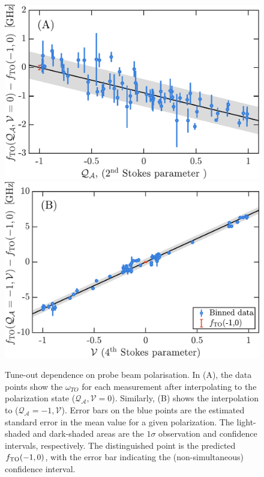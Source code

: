 	\begin{figure}
	\centering
	\includegraphics[width=\textwidth]{fig/tuneout/q_dep_1_min.pdf}
	\includegraphics[width=\textwidth]{fig/tuneout/v_dep_1_min.pdf}
	\caption{
	Tune-out dependence on probe beam polarisation.
	 In (A), the data points show the $\omega_{TO}$ for each measurement after interpolating to the polarization state  ($\mathcal{Q_{A}},\mathcal{V}=0$). 
	Similarly, (B) shows the interpolation to  ($\mathcal{Q_{A}}=-1,\mathcal{V}$). 
	Error bars on the blue points are the estimated standard error in the mean value for a given polarization. The light-shaded and dark-shaded areas are the $1\sigma$ observation and confidence intervals, respectively. 
	The distinguished point is the predicted $f_\mathrm{TO}(-1,0)$, with the error bar indicating the (non-simultaneous) confidence interval.
	}
	\label{fig:pol_TO} 
	\end{figure}
